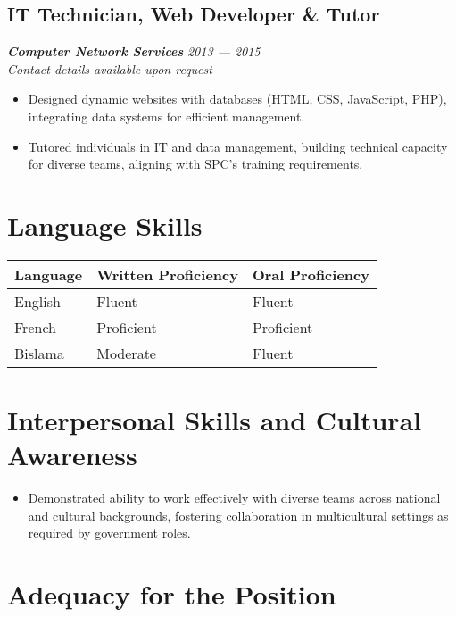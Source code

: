 \documentclass[
  letterpaper,
  DIV=11,
  numbers=noendperiod]{scrartcl}
\providecommand{\tightlist}{%
  \setlength{\itemsep}{0pt}\setlength{\parskip}{0pt}}
\begin{document}
\subsection{IT Technician, Web Developer \&
Tutor}\label{it-technician-web-developer-tutor}

\textbf{\emph{Computer Network Services}} {\emph{2013 --- 2015}}\\
\emph{Contact details available upon request}

\begin{itemize}
\tightlist
\item
  Designed dynamic websites with databases (HTML, CSS, JavaScript, PHP),
  integrating data systems for efficient management.
\item
  Tutored individuals in IT and data management, building technical
  capacity for diverse teams, aligning with SPC's training requirements.
\end{itemize}

\section{Language Skills}\label{language-skills}

\begin{longtable}[]{@{}lll@{}}
\toprule\noalign{}
Language & Written Proficiency & Oral Proficiency \\
\midrule\noalign{}
\endhead
\bottomrule\noalign{}
\endlastfoot
English & Fluent & Fluent \\
French & Proficient & Proficient \\
Bislama & Moderate & Fluent \\
\end{longtable}

\section{Interpersonal Skills and Cultural
Awareness}\label{interpersonal-skills-and-cultural-awareness}

\begin{itemize}
\tightlist
\item
  Demonstrated ability to work effectively with diverse teams across
  national and cultural backgrounds, fostering collaboration in
  multicultural settings as required by government roles.
\end{itemize}

\section{Adequacy for the Position}\label{adequacy-for-the-position}
\end{document}
